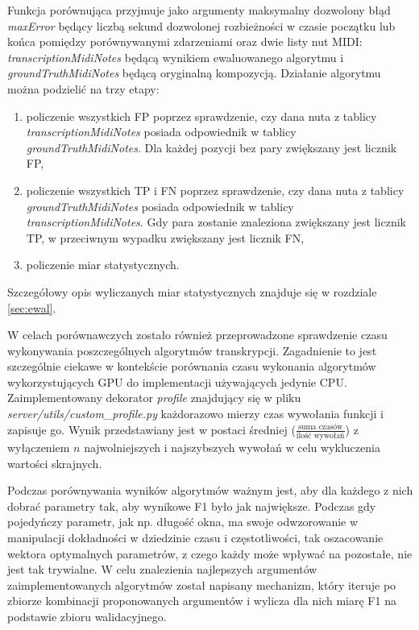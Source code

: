 \documentclass[12pt,a4paper,twoside]{mwart}
\begin{document}
Funkcja porównująca przyjmuje jako argumenty maksymalny dozwolony błąd \textit{maxError} będący liczbą sekund dozwolonej rozbieżności w czasie początku lub końca pomiędzy porównywanymi zdarzeniami oraz dwie listy nut MIDI: \mbox{\textit{transcriptionMidiNotes}} będącą wynikiem ewaluowanego algorytmu i \mbox{\textit{groundTruthMidiNotes}} będącą oryginalną kompozycją. Działanie algorytmu można podzielić na trzy etapy:
\begin{enumerate}
  \item policzenie wszystkich FP poprzez sprawdzenie, czy dana nuta z tablicy \\\textit{transcriptionMidiNotes} posiada odpowiednik w tablicy \textit{groundTruthMidiNotes}. Dla każdej pozycji bez pary zwiększany jest licznik FP,
  \item policzenie wszystkich TP i FN poprzez sprawdzenie, czy dana nuta z tablicy \\\textit{groundTruthMidiNotes} posiada odpowiednik w tablicy \textit{transcriptionMidiNotes}. Gdy para zostanie znaleziona zwiększany jest licznik TP, w przeciwnym wypadku zwiększany jest licznik FN,
  \item policzenie miar statystycznych.
\end{enumerate}
Szczegółowy opis wyliczanych miar statystycznych znajduje się w rozdziale \ref{sec:ewal}.

W celach porównawczych zostało również przeprowadzone sprawdzenie czasu wykonywania poszczególnych algorytmów transkrypcji. Zagadnienie to jest szczególnie ciekawe w kontekście porównania czasu wykonania algorytmów wykorzystujących GPU do implementacji używających jedynie CPU. Zaimplementowany dekorator \textit{profile} znajdujący się w pliku \mbox{\textit{server/utils/custom\_profile.py}} każdorazowo mierzy czas wywołania funkcji i zapisuje go. Wynik przedstawiany jest w postaci średniej ($\frac{\textrm{suma czasów}}{\textrm{ilość wywołań}}$) z wyłączeniem $n$ najwolniejszych i najszybszych wywołań w celu wykluczenia wartości skrajnych.

Podczas porównywania wyników algorytmów ważnym jest, aby dla każdego z nich dobrać parametry tak, aby wynikowe F1 było jak największe. Podczas gdy pojedyńczy parametr, jak np. długość okna, ma swoje odwzorowanie w manipulacji dokładności w dziedzinie czasu i częstotliwości, tak oszacowanie wektora optymalnych parametrów, z czego każdy może wpływać na pozostałe, nie jest tak trywialne. W celu znalezienia najlepszych argumentów zaimplementowanych algorytmów został napisany mechanizm, który iteruje po zbiorze kombinacji proponowanych argumentów i wylicza dla nich miarę F1 na podstawie zbioru walidacyjnego. 
\end{document}
